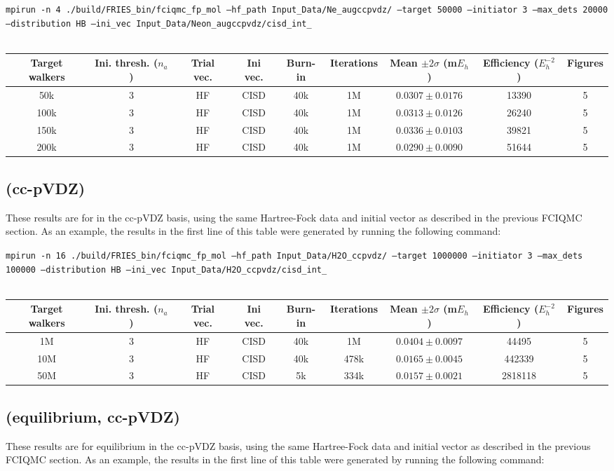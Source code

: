 \documentclass[12pt, landscape]{article}
\begin{document}
\texttt{mpirun -n 4 ./build/FRIES\_bin/fciqmc\_fp\_mol --hf\_path Input\_Data/Ne\_augccpvdz/ --target 50000 --initiator 3 --max\_dets 20000 --distribution HB --ini\_vec Input\_Data/Neon\_augccpvdz/cisd\_int\_}
\\~\\
\begin{tabular}{c|c|c|c|c|c|c|c|c}
Target walkers & Ini. thresh. ($n_a$) & Trial vec. & Ini vec. & Burn-in & Iterations & Mean $\pm 2 \sigma$ (m$E_h$) & Efficiency ($E_h^{-2}$) & Figures \\ \hline
50k & 3 & HF & CISD & 40k & 1M & $0.0307 \pm 0.0176$ & 13390 & 5 \\
100k & 3 & HF & CISD & 40k & 1M & $0.0313 \pm 0.0126$ & 26240 & 5 \\
150k & 3 & HF & CISD & 40k & 1M & $0.0336 \pm 0.0103$ & 39821 & 5 \\
200k & 3 & HF & CISD & 40k & 1M & $0.0290 \pm 0.0090$ & 51644 & 5 \\
\end{tabular}


\subsection*{ (cc-pVDZ)}
These results are for  in the cc-pVDZ basis, using the same Hartree-Fock data and initial vector as described in the previous FCIQMC section. As an example, the results in the first line of this table were generated by running the following command:

\texttt{mpirun -n 16 ./build/FRIES\_bin/fciqmc\_fp\_mol --hf\_path Input\_Data/H2O\_ccpvdz/ --target 1000000 --initiator 3 --max\_dets 100000 --distribution HB --ini\_vec Input\_Data/H2O\_ccpvdz/cisd\_int\_}
\\~\\
\begin{tabular}{c|c|c|c|c|c|c|c|c}
Target walkers & Ini. thresh. ($n_a$) & Trial vec. & Ini vec. & Burn-in & Iterations & Mean $\pm 2 \sigma$ (m$E_h$) & Efficiency ($E_h^{-2}$) & Figures \\ \hline
1M & 3 & HF & CISD & 40k & 1M & $0.0404 \pm 0.0097$ & 44495 & 5\\
10M & 3 & HF & CISD & 40k & 478k & $0.0165 \pm 0.0045$ & 442339 & 5\\
50M & 3 & HF & CISD & 5k & 334k & $0.0157 \pm 0.0021$ & 2818118 & 5 \\
\end{tabular}

\subsection*{ (equilibrium, cc-pVDZ)}
These results are for equilibrium  in the cc-pVDZ basis, using the same Hartree-Fock data and initial vector as described in the previous FCIQMC section. As an example, the results in the first line of this table were generated by running the following command:
\end{document}
